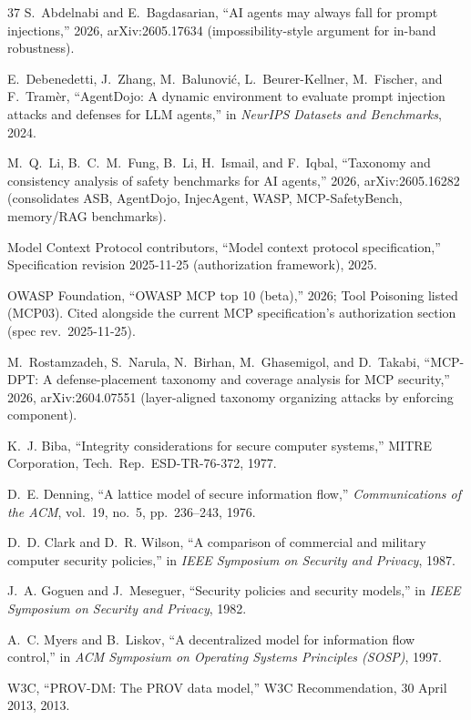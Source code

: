 \documentclass[conference]{IEEEtran}
\begin{document}
\begin{thebibliography}{37}
 S.~Abdelnabi and E.~Bagdasarian, ``AI agents
may always fall for prompt injections,'' 2026, arXiv:2605.17634
(impossibility-style argument for in-band robustness).

 E.~Debenedetti, J.~Zhang, M.~Balunovi\'c,
L.~Beurer-Kellner, M.~Fischer, and F.~Tram\`er, ``AgentDojo: A
dynamic environment to evaluate prompt injection attacks and
defenses for LLM agents,'' in \emph{NeurIPS Datasets and
Benchmarks}, 2024.

 M.~Q.~Li, B.~C.~M.~Fung, B.~Li, H.~Ismail, and
F.~Iqbal, ``Taxonomy and consistency analysis of
safety benchmarks for AI agents,'' 2026, arXiv:2605.16282
(consolidates ASB, AgentDojo, InjecAgent, WASP, MCP-SafetyBench,
memory/RAG benchmarks).

 Model Context Protocol contributors, ``Model
context protocol specification,'' Specification revision
2025-11-25 (authorization framework), 2025.

 OWASP Foundation, ``OWASP MCP top 10 (beta),''
2026; Tool Poisoning listed (MCP03). Cited alongside the current
MCP specification's authorization section (spec rev.\ 2025-11-25).

 M.~Rostamzadeh, S.~Narula, N.~Birhan,
M.~Ghasemigol, and D.~Takabi, ``MCP-DPT: A defense-placement taxonomy
and coverage analysis for MCP security,'' 2026,
arXiv:2604.07551 (layer-aligned taxonomy organizing attacks by
enforcing component).

 K.~J. Biba, ``Integrity considerations for secure
computer systems,'' MITRE Corporation, Tech.\ Rep.\ ESD-TR-76-372,
1977.

 D.~E. Denning, ``A lattice model of secure
information flow,'' \emph{Communications of the ACM}, vol.~19,
no.~5, pp.~236--243, 1976.

 D.~D. Clark and D.~R. Wilson, ``A comparison
of commercial and military computer security policies,'' in
\emph{IEEE Symposium on Security and Privacy}, 1987.

 J.~A. Goguen and J.~Meseguer, ``Security policies
and security models,'' in \emph{IEEE Symposium on Security and
Privacy}, 1982.

 A.~C. Myers and B.~Liskov, ``A decentralized
model for information flow control,'' in \emph{ACM Symposium on
Operating Systems Principles (SOSP)}, 1997.

 W3C, ``PROV-DM: The PROV data model,'' W3C
Recommendation, 30 April 2013, 2013.


\end{thebibliography}
\end{document}
